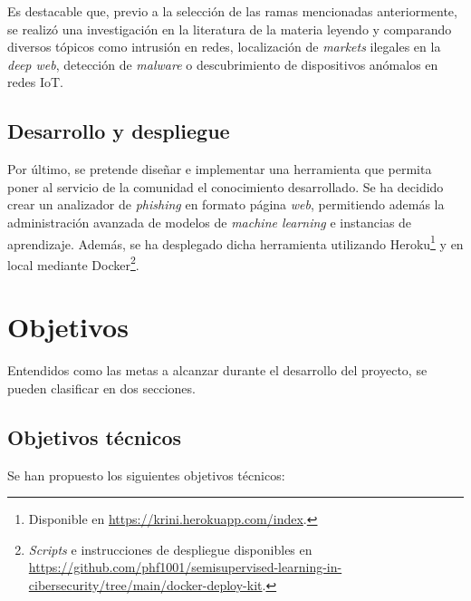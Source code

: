 Es destacable que, previo a la selección de las ramas mencionadas anteriormente, se realizó una investigación en la literatura de la materia leyendo y comparando diversos tópicos como intrusión en redes, localización de \textit{markets} ilegales en la \textit{deep web}, detección de \textit{malware} o descubrimiento de dispositivos anómalos en redes IoT.

\subsection{Desarrollo y despliegue}

Por último, se pretende diseñar e implementar una herramienta que permita poner al servicio de la comunidad el conocimiento desarrollado. Se ha decidido crear un analizador de \textit{phishing} en formato página \textit{web}, permitiendo además la administración avanzada de modelos de \textit{machine learning} e instancias de aprendizaje. Además, se ha desplegado dicha herramienta utilizando Heroku\footnote{Disponible en \url{https://krini.herokuapp.com/index}.} y en local mediante Docker\footnote{\textit{Scripts} e instrucciones de despliegue disponibles en \url{https://github.com/phf1001/semisupervised-learning-in-cibersecurity/tree/main/docker-deploy-kit}.}.

\section{Objetivos}

Entendidos como las metas a alcanzar durante el desarrollo del proyecto, se pueden clasificar en dos secciones.

\subsection{Objetivos técnicos}
\label{Objetivos técnicos}

Se han propuesto los siguientes objetivos técnicos:

